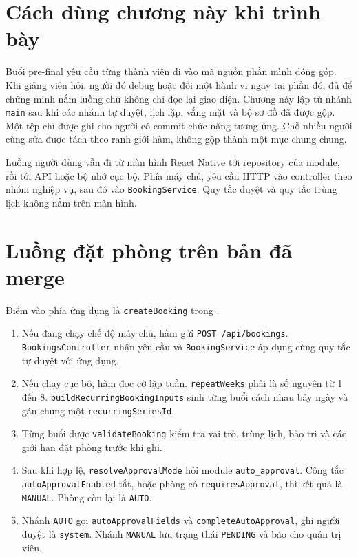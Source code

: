 \documentclass[../DoAn.tex]{subfiles}
\begin{document}
\section{Cách dùng chương này khi trình bày}
\label{section:assignment-use}

Buổi pre-final yêu cầu từng thành viên đi vào mã nguồn phần mình đóng góp. Khi giảng viên hỏi, người đó debug hoặc đổi một hành vi ngay tại phần đó, đủ để chứng minh nắm luồng chứ không chỉ đọc lại giao diện. Chương này lập từ nhánh \texttt{main} sau khi các nhánh tự duyệt, lịch lặp, vắng mặt và bộ sơ đồ đã được gộp. Một tệp chỉ được ghi cho người có commit chức năng tương ứng. Chỗ nhiều người cùng sửa được tách theo ranh giới hàm, không gộp thành một mục chung chung.

Luồng người dùng vẫn đi từ màn hình React Native tới repository của module, rồi tới API hoặc bộ nhớ cục bộ. Phía máy chủ, yêu cầu HTTP vào controller theo nhóm nghiệp vụ, sau đó vào \texttt{BookingService}. Quy tắc duyệt và quy tắc trùng lịch không nằm trên màn hình.

\section{Luồng đặt phòng trên bản đã merge}
\label{section:assignment-flow}

Điểm vào phía ứng dụng là \texttt{createBooking} trong .

\begin{enumerate}[leftmargin=1.6em]
  \item Nếu đang chạy chế độ máy chủ, hàm gửi \texttt{POST /api/bookings}. \texttt{BookingsController} nhận yêu cầu và \texttt{BookingService} áp dụng cùng quy tắc tự duyệt với ứng dụng.
  \item Nếu chạy cục bộ, hàm đọc cờ lặp tuần. \texttt{repeatWeeks} phải là số nguyên từ 1 đến 8. \texttt{buildRecurringBookingInputs} sinh từng buổi cách nhau bảy ngày và gán chung một \texttt{recurringSeriesId}.
  \item Từng buổi được \texttt{validateBooking} kiểm tra vai trò, trùng lịch, bảo trì và các giới hạn đặt phòng trước khi ghi.
  \item Sau khi hợp lệ, \texttt{resolveApprovalMode} hỏi module \texttt{auto\_approval}. Công tắc \texttt{autoApprovalEnabled} tắt, hoặc phòng có \texttt{requiresApproval}, thì kết quả là \texttt{MANUAL}. Phòng còn lại là \texttt{AUTO}.
  \item Nhánh \texttt{AUTO} gọi \texttt{autoApprovalFields} và \texttt{completeAutoApproval}, ghi người duyệt là \texttt{system}. Nhánh \texttt{MANUAL} lưu trạng thái \texttt{PENDING} và báo cho quản trị viên.
\end{enumerate}
\end{document}
